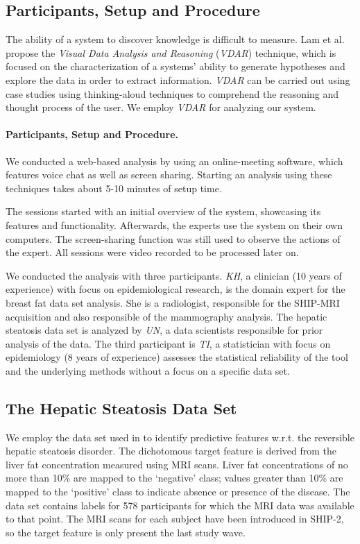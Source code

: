 \documentclass[journal]{style/vgtc} 			          %
\begin{document}
\subsection{Participants, Setup and Procedure}
The ability of a system to discover knowledge is difficult to measure.
Lam et al.~\cite{Lam2012} propose the \emph{Visual Data Analysis and Reasoning} (\emph{VDAR}) technique, which is focused on the characterization of a systems' ability to generate hypotheses and explore the data in order to extract information.
\emph{VDAR} can be carried out using case studies using thinking-aloud techniques to comprehend the reasoning and thought process of the user.
We employ \emph{VDAR} for analyzing our system.
\paragraph{Participants, Setup and Procedure.}
We conducted a web-based analysis by using an online-meeting software, which features voice chat as well as screen sharing.
Starting an analysis using these techniques takes about 5-10 minutes of setup time.

The sessions started with an initial overview of the system, showcasing its features and functionality.
Afterwards, the experts use the system on their own computers.
The screen-sharing function was still used to observe the actions of the expert.
All sessions were video recorded to be processed later on.

We conducted the analysis with three participants.
\emph{KH}, a clinician (10 years of experience) with focus on epidemiological research, is the domain expert for the breast fat data set analysis.
She is a radiologist, responsible for the SHIP-MRI acquisition and also responsible of the mammography analysis.
The hepatic steatosis data set is analyzed by \emph{UN}, a data scientists responsible for prior analysis of the data.
The third participant is \emph{TI}, a statistician with focus on epidemiology (8 years of experience) assesses the statistical reliability of the tool and the underlying methods without a focus on a specific data set.
\subsection{The Hepatic Steatosis Data Set}
We employ the data set used in \cite{Niemann2014} to identify predictive features w.r.t. the reversible hepatic steatosis disorder.
The dichotomous target feature is derived from the liver fat concentration measured using MRI scans.
Liver fat concentrations of no more than 10\% are mapped to the `negative' class; values greater than 10\% are mapped to the `positive' class to indicate absence or presence of the disease.
The data set contains labels for 578 participants for which the MRI data was available to that point.
The MRI scans for each subject have been introduced in SHIP-2, so the target feature is only present the last study wave.
\end{document}
